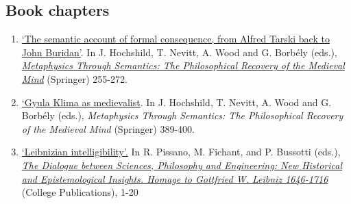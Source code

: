 \subsection{Book chapters}
\begin{enumerate}
	\setcounter{enumi}{\value{publicationCounter}}	%
\item {}
{}
{
	\href{https://www.academia.edu/29440650/The_semantic_account_of_formal_consequence_from_Alfred_Tarski_back_to_John_Buridan}{`The semantic account of formal consequence, from Alfred Tarski back to John Buridan'}. In J. Hochshild, T. Nevitt, A. Wood and G. Borb\'{e}ly (eds.), \href{https://link.springer.com/chapter/10.1007/978-3-031-15026-5_15}{\emph{Metaphysics Through Semantics: The Philosophical Recovery of the Medieval Mind}} (Springer) 255-272.}
{}
\item \datedsubsectionnarrow{}
{}
{
	\href{https://link.springer.com/content/pdf/bbm:978-3-031-15026-5/1}{`Gyula Klima as medievalist}. In J. Hochshild, T. Nevitt, A. Wood and G. Borb\'{e}ly (eds.), \emph{Metaphysics Through Semantics: The Philosophical Recovery of the Medieval Mind} (Springer) 389-400.}
{}
\item {}
{}
{
	\href{https://www.academia.edu/14265939/Leibnizian_intelligibility}{`Leibnizian intelligibility'.} In R. Pissano, M. Fichant, and P. Bussotti (eds.), \href{http://collegepublications.co.uk/dialogues/?00005}{\emph{The Dialogue between Sciences, Philosophy and Engineering: New Historical and Epistemological Insights. Homage to Gottfried W. Leibniz 1646-1716}} (College Publications), 1-20}
{}
	\setcounter{publicationCounter}{\value{enumi}}	%
\end{enumerate}
